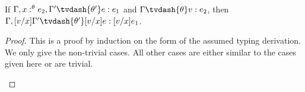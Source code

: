 \begin{lemma}
  \label{lemma:substitution}
  If $\Gamma,x:^\theta e_2,\Gamma' \tvdash{\theta'} e:e_1$ and 
  $\Gamma \tvdash{\theta} v:e_2$, 
  then $\Gamma,[v/x]\Gamma' \tvdash{\theta'} [v/x]e:[v/x]e_1$.
\end{lemma}
\begin{proof}
  This is a proof by induction on the form of the assumed typing
  derivation. We only give the non-trivial cases.  All other cases are
  either similar to the cases given here or are trivial.
  \begin{itemize}



\end{itemize}
\end{proof}
